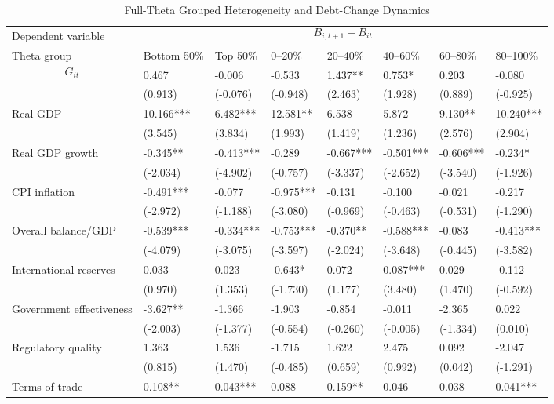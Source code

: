 \begin{table}[H]\centering
\begin{threeparttable}
\caption{Full-Theta Grouped Heterogeneity and Debt-Change Dynamics}
\label{tab:theta_group_heterogeneity_debt}
\scriptsize
\begin{tabularx}{\textwidth}{lYYYYYYY}
\toprule
Dependent variable &  \\
\cmidrule(lr){2-8}
Theta group & Bottom 50\% & Top 50\% & 0--20\% & 20--40\% & 40--60\% & 60--80\% & 80--100\% \\
\midrule
$$G_{it}$$ & 0.467 & -0.006 & -0.533 & 1.437** & 0.753* & 0.203 & -0.080 \\
  & (0.913) & (-0.076) & (-0.948) & (2.463) & (1.928) & (0.889) & (-0.925) \\
Real GDP & 10.166*** & 6.482*** & 12.581** & 6.538 & 5.872 & 9.130** & 10.240*** \\
  & (3.545) & (3.834) & (1.993) & (1.419) & (1.236) & (2.576) & (2.904) \\
Real GDP growth & -0.345** & -0.413*** & -0.289 & -0.667*** & -0.501*** & -0.606*** & -0.234* \\
  & (-2.034) & (-4.902) & (-0.757) & (-3.337) & (-2.652) & (-3.540) & (-1.926) \\
CPI inflation & -0.491*** & -0.077 & -0.975*** & -0.131 & -0.100 & -0.021 & -0.217 \\
  & (-2.972) & (-1.188) & (-3.080) & (-0.969) & (-0.463) & (-0.531) & (-1.290) \\
Overall balance/GDP & -0.539*** & -0.334*** & -0.753*** & -0.370** & -0.588*** & -0.083 & -0.413*** \\
  & (-4.079) & (-3.075) & (-3.597) & (-2.024) & (-3.648) & (-0.445) & (-3.582) \\
International reserves & 0.033 & 0.023 & -0.643* & 0.072 & 0.087*** & 0.029 & -0.112 \\
  & (0.970) & (1.353) & (-1.730) & (1.177) & (3.480) & (1.470) & (-0.592) \\
Government effectiveness & -3.627** & -1.366 & -1.903 & -0.854 & -0.011 & -2.365 & 0.022 \\
  & (-2.003) & (-1.377) & (-0.554) & (-0.260) & (-0.005) & (-1.334) & (0.010) \\
Regulatory quality & 1.363 & 1.536 & -1.715 & 1.622 & 2.475 & 0.092 & -2.047 \\
  & (0.815) & (1.470) & (-0.485) & (0.659) & (0.992) & (0.042) & (-1.291) \\
Terms of trade & 0.108** & 0.043*** & 0.088 & 0.159** & 0.046 & 0.038 & 0.041*** \\

\end{tabularx}
\end{threeparttable}
\end{table}
